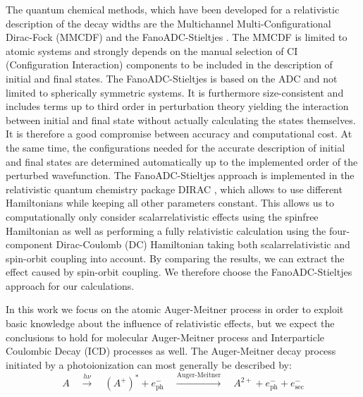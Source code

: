 The quantum chemical methods, which have been developed for a relativistic
description of the decay widths are the Multichannel Multi-Configurational
Dirac-Fock (MMCDF) \cite{Fritzsche11} and the FanoADC-Stieltjes \cite{Fasshauer15_1}.
The MMCDF is limited to atomic systems and strongly depends on
the manual selection of CI (Configuration
Interaction) components to be included in the description of initial and      
final states.
The FanoADC-Stieltjes is based on the ADC and not limited to spherically symmetric
systems.
It is furthermore size-consistent and includes terms up to third order
in perturbation theory yielding the interaction between initial and final state
without actually calculating the states themselves.
It is therefore a good compromise between
accuracy and computational cost. At the same time, the configurations needed for the
accurate description of initial and final states are determined automatically up to
the implemented order of the perturbed wavefunction.
The FanoADC-Stieltjes approach is implemented in the relativistic
quantum chemistry package
DIRAC \cite{DIRAC17}, which allows to use different Hamiltonians while keeping
all other parameters constant. This allows us to computationally only consider
scalarrelativistic effects using the spinfree Hamiltonian as well as
performing a fully relativistic calculation using the four-component
Dirac-Coulomb (DC) Hamiltonian taking both scalarrelativistic and
spin-orbit coupling into account.
By comparing the results, we can extract the effect caused by spin-orbit coupling.
We therefore choose the FanoADC-Stieltjes approach for our calculations.


In this work we focus on the atomic Auger-Meitner process     
in order                                      
to exploit basic knowledge about the influence of relativistic effects,
but we expect the conclusions to hold for molecular Auger-Meitner process and
Interparticle Coulombic Decay (ICD) processes
\cite{Cederbaum97,Marburger03,Hergenhahn11,Jahnke15} as well.
The Auger-Meitner decay process initiated by a photoionization
can most generally be described by:
\begin{equation*}                                               
 A \quad \xrightarrow{h\nu}\quad (A^+)^* + e^-_\text{ph} \quad       
    \xrightarrow{\text{Auger-Meitner}} \quad A^{2+} + e^-_\text{ph} + e^-_\text{sec}     
\end{equation*}                                                 
                                                                
